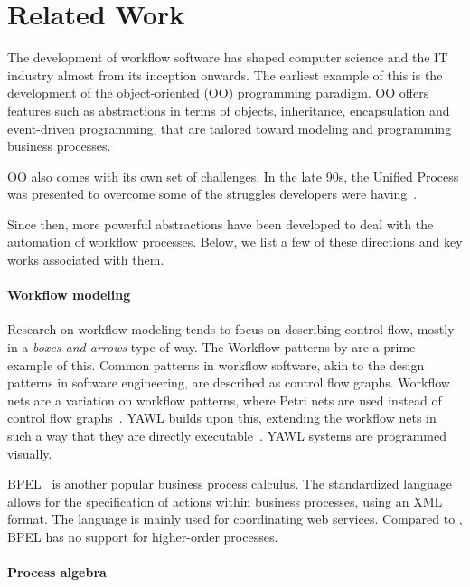 
\section{Related Work}
\label{sec:relatedwork}

The development of workflow software has shaped computer science and the IT industry almost from its inception onwards.
The earliest example of this is the development of the object-oriented (OO) programming paradigm.
OO offers features such as abstractions in terms of objects, inheritance, encapsulation and event-driven programming, that are tailored toward modeling and programming business processes.

OO also comes with its own set of challenges.
In the late 90s, the Unified Process was presented to overcome some of the struggles developers were having~\cite{DBLP:books/daglib/0000196}.

Since then, more powerful abstractions have been developed to deal with the automation of workflow processes.
Below, we list a few of these directions and key works associated with them.

\paragraph{Workflow modeling}

Research on workflow modeling tends to focus on describing control flow, mostly in a \textit{boxes and arrows} type of way.
The Workflow patterns by \citet{journals/dpd/AalstHKB03} are a prime example of this. 
Common patterns in workflow software, akin to the design patterns in software engineering, are described as control flow graphs.
Workflow nets are a variation on workflow patterns, where Petri nets are used instead of control flow graphs~\cite{journals/infsof/LassenA09,journals/jcsc/Aalst98}.
YAWL builds upon this, extending the workflow nets in such a way that they are directly executable~\cite{journals/is/AalstH05}.
YAWL systems are programmed visually.

BPEL~\cite{bpel} is another popular business process calculus.
The standardized language allows for the specification of actions within business processes, using an XML format.
The language is mainly used for coordinating web services.
Compared to \TOPHAT, BPEL has no support for higher-order processes.

\paragraph{Process algebra}

